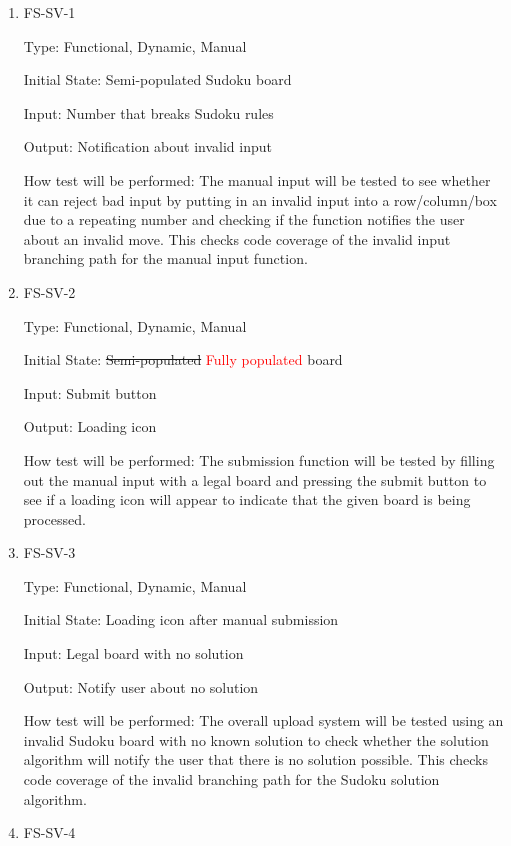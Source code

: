 \documentclass[11pt]{article}
\begin{document}
\begin{enumerate}

\item{FS-SV-1\\}

Type: Functional, Dynamic, Manual
					
Initial State: Semi-populated Sudoku board
					
Input: Number that breaks Sudoku rules
					
Output: Notification about invalid input
					
How test will be performed: The manual input will be tested to see whether it can reject bad input by putting in an invalid input into a row/column/box due to a repeating number and checking if the function notifies the user about an invalid move. This checks code coverage of the invalid input branching path for the manual input function.
					
\item{FS-SV-2\\}

Type: Functional, Dynamic, Manual
					
Initial State: \sout{Semi-populated} \textcolor{red}{Fully populated} board
					
Input: Submit button
					
Output: Loading icon
					
How test will be performed: The submission function will be tested by filling out the manual input with a legal board and pressing the submit button to see if a loading icon will appear to indicate that the given board is being processed.

\item{FS-SV-3\\}

Type: Functional, Dynamic, Manual
					
Initial State: Loading icon after manual submission
					
Input: Legal board with no solution
					
Output: Notify user about no solution
					
How test will be performed: The overall upload system will be tested using an invalid Sudoku board with no known solution to check whether the solution algorithm will notify the user that there is no solution possible. This checks code coverage of the invalid branching path for the Sudoku solution algorithm.

\item{FS-SV-4\\}


\end{enumerate}
\end{document}
